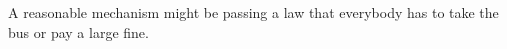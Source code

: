 \documentclass[twoside]{article}
\begin{document}
\begin{enumerate}
\begin{enumerate}
\begin{KEY}
A reasonable mechanism might be passing a law that everybody has to take the bus or pay a large fine.
\end{KEY}

    \end{enumerate}
















\end{enumerate}
\end{document}

